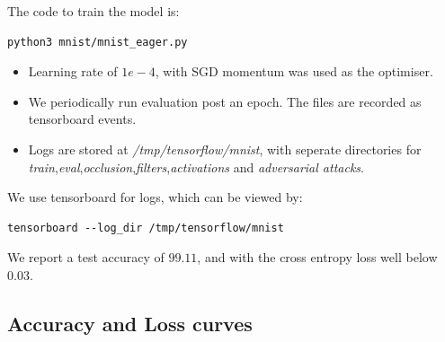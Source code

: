 The code to train the model is:

\begin{lstlisting}
python3 mnist/mnist_eager.py
\end{lstlisting}

\begin{itemize}
\item Learning rate of $1e-4$, with SGD momentum was used as the optimiser.
\item We periodically run evaluation post an epoch. The files are recorded as tensorboard events.
\item Logs are stored at \textit{/tmp/tensorflow/mnist}, with seperate directories for \textit{train},\textit{eval},\textit{occlusion},\textit{filters},\textit{activations} and \textit{adversarial attacks}.
\end{itemize}


We use tensorboard for logs, which can be viewed by:
\begin{lstlisting}
tensorboard --log_dir /tmp/tensorflow/mnist
\end{lstlisting}

We report a test accuracy of $99.11$, and with the cross entropy loss well below $0.03$.

\subsection{Accuracy and Loss curves}

